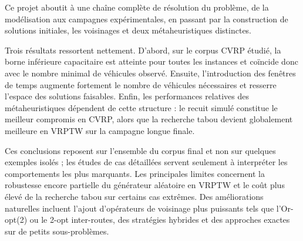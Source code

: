 \documentclass[11pt,a4paper]{article}
\begin{document}
Ce projet aboutit à une chaîne complète de résolution du problème, de la modélisation aux campagnes expérimentales, en passant par la construction de solutions initiales, les voisinages et deux métaheuristiques distinctes.

Trois résultats ressortent nettement. D'abord, sur le corpus CVRP étudié, la borne inférieure capacitaire est atteinte pour toutes les instances et coïncide donc avec le nombre minimal de véhicules observé. Ensuite, l'introduction des fenêtres de temps augmente fortement le nombre de véhicules nécessaires et resserre l'espace des solutions faisables. Enfin, les performances relatives des métaheuristiques dépendent de cette structure : le recuit simulé constitue le meilleur compromis en CVRP, alors que la recherche tabou devient globalement meilleure en VRPTW sur la campagne longue finale.

Ces conclusions reposent sur l'ensemble du corpus final et non sur quelques exemples isolés ; les études de cas détaillées servent seulement à interpréter les comportements les plus marquants. Les principales limites concernent la robustesse encore partielle du générateur aléatoire en VRPTW et le coût plus élevé de la recherche tabou sur certains cas extrêmes. Des améliorations naturelles incluent l'ajout d'opérateurs de voisinage plus puissants tels que l'Or-opt(2) ou le 2-opt inter-routes, des stratégies hybrides et des approches exactes sur de petits sous-problèmes.
\end{document}
